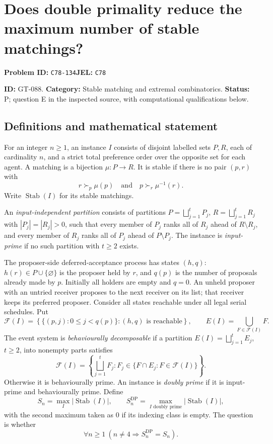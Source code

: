 \documentclass[11pt,a4paper]{article}
\begin{document}
\section*{Does double primality reduce the maximum number of stable matchings?}
\textbf{Problem ID:} \texttt{C78-134}\quad \textbf{JEL:} \texttt{C78}\par
\label{problem:OP-0218}
\label{game:GT-088}
{\sffamily\small\color{muted}
\noindent\textbf{ID:} GT-088. \textbf{Category:} Stable matching and extremal combinatorics.
\textbf{Status:} P; question E in the inspected source, with computational qualifications below.
\par}
\subsection*{Definitions and mathematical statement}
For an integer $n\geq 1$, an instance $I$ consists of disjoint labelled sets $P,R$, each of cardinality $n$, and a strict total preference order over the opposite set for each agent. A matching is a bijection $\mu:P\to R$. It is stable if there is no pair $(p,r)$ with
\[
 r\succ_p\mu(p)\quad\text{and}\quad p\succ_r\mu^{-1}(r).
\]
Write $\operatorname{Stab}(I)$ for its stable matchings.

An \emph{input-independent partition} consists of partitions
$P=\bigsqcup_{j=1}^tP_j$, $R=\bigsqcup_{j=1}^tR_j$ with $|P_j|=|R_j|>0$, such that every member of $P_j$ ranks all of $R_j$ ahead of $R\setminus R_j$, and every member of $R_j$ ranks all of $P_j$ ahead of $P\setminus P_j$. The instance is \emph{input-prime} if no such partition with $t\geq2$ exists.

The proposer-side deferred-acceptance process has states $(h,q)$: $h(r)\in P\cup\{\varnothing\}$ is the proposer held by $r$, and $q(p)$ is the number of proposals already made by $p$. Initially all holders are empty and $q=0$. An unheld proposer with an untried receiver proposes to the next receiver on its list; that receiver keeps its preferred proposer. Consider all states reachable under all legal serial schedules. Put
\[
 \mathcal F(I)=\left\{\{(p,j):0\leq j<q(p)\}: (h,q)\text{ is reachable}\right\},
 \qquad E(I)=\bigcup_{F\in\mathcal F(I)}F.
\]
The event system is \emph{behaviourally decomposable} if a partition
$E(I)=\bigsqcup_{j=1}^tE_j$, $t\geq2$, into nonempty parts satisfies
\[
 \mathcal F(I)=\left\{\bigsqcup_{j=1}^tF_j:
 F_j\in\{F\cap E_j:F\in\mathcal F(I)\}\right\}.
\]
Otherwise it is behaviourally prime. An instance is \emph{doubly prime} if it is input-prime and behaviourally prime. Define
\[
 S_n=\max_I|\operatorname{Stab}(I)|,\qquad
 S_n^{\mathrm{DP}}=\max_{I\text{ doubly prime}}|\operatorname{Stab}(I)|,
\]
with the second maximum taken as $0$ if its indexing class is empty. The question is whether
\[
 \forall n\geq1\ (n\neq4\Longrightarrow S_n^{\mathrm{DP}}=S_n).
\]
\end{document}
